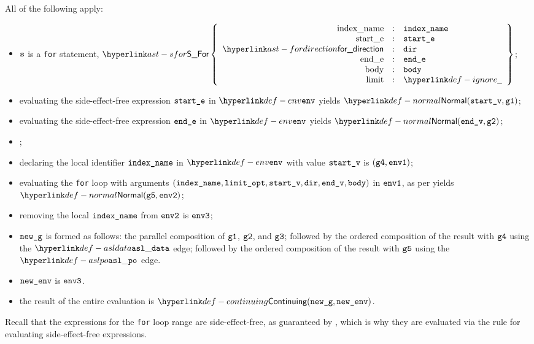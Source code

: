 \ProseParagraph
All of the following apply:
\begin{itemize}
  \item $\texttt{s}$ is a \texttt{for} statement, $\SFor\left\{\begin{array}{rcl}
    \Forindexname &:& \vindexname\\
    \Forstarte &:& \vstarte\\
    \fordirection &:& \vdir\\
    \Forende &:& \vende\\
    \Forbody &:& \vbody\\
    \Forlimit &:& \Ignore
  \end{array}\right\}$;
  \item evaluating the side-effect-free expression $\texttt{start\_e}$ in $\env$ yields
        $\Normal(\vstartv, \vgone)$\ProseOrError;
  \item evaluating the side-effect-free expression $\texttt{end\_e}$ in $\env$ yields
        $\Normal(\vendv, \vgtwo)$\ProseOrError;
  \item \Proseevallimit{$\env$}{$\velimitopt$}{$\Normal(\vlimitopt, \vgthree)$}\ProseOrError;
  \item declaring the local identifier $\texttt{index\_name}$ in $\env$ with value $\texttt{start\_v}$ is $(\texttt{g4}, \texttt{env1})$;
  \item evaluating the \texttt{for} loop with arguments $(\texttt{index\_name}, \texttt{limit\_opt}, \texttt{start\_v}, \texttt{dir}, \texttt{end\_v}, \texttt{body})$ in $\texttt{env1}$,
        as per  yields $\Normal(\vgfive, \envtwo)$\ProseOrAbnormal;
  \item removing the local $\texttt{index\_name}$ from $\texttt{env2}$ is $\texttt{env3}$;
  \item $\texttt{new\_g}$ is formed as follows:
        the parallel composition of $\texttt{g1}$, $\texttt{g2}$, and $\texttt{g3}$;
        followed by the ordered composition of the result with $\texttt{g4}$ using the $\asldata$ edge;
        followed by the ordered composition of the result with $\texttt{g5}$ using the $\aslpo$ edge.
  \item $\texttt{new\_env}$ is $\texttt{env3}$.
  \item the result of the entire evaluation is $\Continuing(\newg, \newenv)$.
\end{itemize}
\FormallyParagraph
Recall that the expressions for the \texttt{for} loop range are
side-effect-free, as guaranteed by , which is why
they are evaluated via the rule for evaluating side-effect-free expressions.
